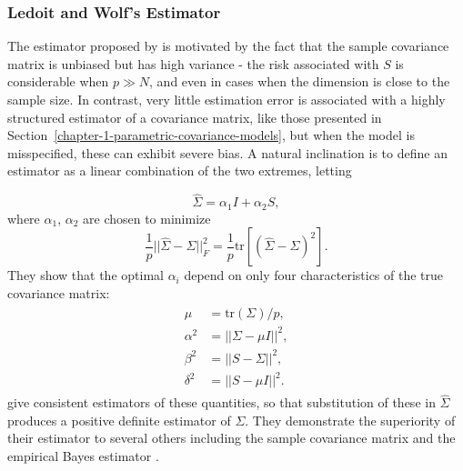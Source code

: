 \subsubsection{Ledoit and Wolf's Estimator}

The estimator proposed by \cite{ledoit2004well} is motivated by the fact that the sample covariance matrix is unbiased but has high variance - the risk associated with $S$ is considerable when $p \gg N$, and even in cases when the dimension is close to the sample size. In contrast, very little estimation error is associated with a highly structured estimator of a covariance matrix, like those presented in Section~\ref{chapter-1-parametric-covariance-models}, but when the model is misspecified, these can exhibit severe bias. A natural inclination is to define an estimator as a linear combination of the two extremes, letting

\begin{equation} \label{eq:ledoit-wolf-estimator}
\hat{\Sigma} = \alpha_1 I + \alpha_2 S,
\end{equation}
\noindent
where $\alpha_1$, $\alpha_2$ are chosen to minimize 
\[
\frac{1}{p} \vert \vert\hat{\Sigma}-\Sigma   \vert \vert_{F}^2 = \frac{1}{p} \mbox{tr}\left[ \left(\hat{\Sigma}-\Sigma \right)^2\right].
\] 
\noindent
They show that the optimal $\alpha_i$ depend on only four characteristics of the true covariance matrix:
\begin{align}
\begin{split}
\mu &= \mbox{tr}\left(\Sigma\right)/p, \\
\alpha^2 &= \vert\vert \Sigma - \mu I\vert\vert^2, \\
\beta^2 &= \vert\vert S - \Sigma  \vert\vert^2, \\
\delta^2 &= \vert\vert S - \mu I\vert\vert^2.
\end{split}
\end{align}
\noindent
\cite{ledoit2004well} give consistent estimators of these quantities, so that substitution of these in $\hat{\Sigma}$ produces a positive definite estimator of $\Sigma$. They demonstrate the superiority of their estimator to several others including the sample covariance matrix and the empirical Bayes estimator \citep{haff1980empirical}.


\bigskip



